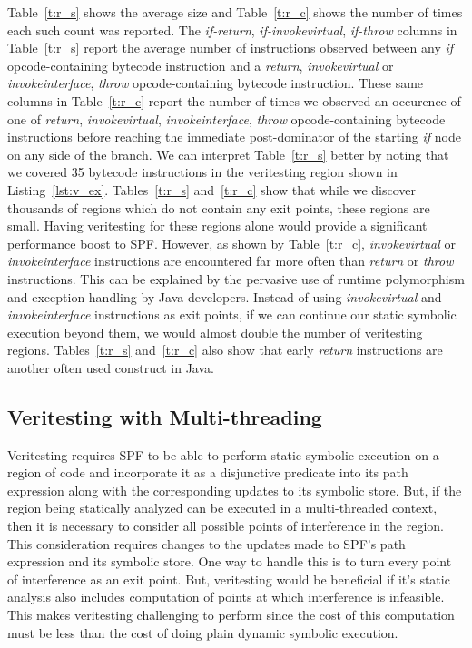 Table~\ref{t:r_s} shows the average size and Table~\ref{t:r_c} shows the number of times each such count was reported. 
%
The \textit{if-return}, \textit{if-invokevirtual}, \textit{if-throw} columns in Table~\ref{t:r_s} report the average number of instructions observed between any \textit{if} opcode-containing bytecode instruction and a \textit{return}, \textit{invokevirtual} or \textit{invokeinterface}, \textit{throw} opcode-containing bytecode instruction.
%
These same columns in Table~\ref{t:r_c} report the number of times we observed an occurence of one of \textit{return}, \textit{invokevirtual}, \textit{invokeinterface}, \textit{throw} opcode-containing bytecode instructions before reaching the immediate post-dominator of the starting \textit{if} node on any side of the branch.
%
We can interpret Table~\ref{t:r_s} better by noting that we covered 35 bytecode instructions in the veritesting region shown in Listing~\ref{lst:v_ex}.
%
Tables~\ref{t:r_s} and~\ref{t:r_c} show that while we discover thousands of regions which do not contain any exit points, these regions are small.
%
Having veritesting for these regions alone would provide a significant performance boost to SPF.
%
However, as shown by Table~\ref{t:r_c}, \textit{invokevirtual} or \textit{invokeinterface} instructions are encountered far more often than \textit{return} or \textit{throw} instructions.
%
This can be explained by the pervasive use of runtime polymorphism and exception handling by Java developers.
%
Instead of using \textit{invokevirtual} and \textit{invokeinterface} instructions as exit points, if we can continue our static symbolic execution beyond them, we would almost double the number of veritesting regions.
%
Tables~\ref{t:r_s} and~\ref{t:r_c} also show that early \textit{return} instructions are another often used construct in Java.
%
\subsection{Veritesting with Multi-threading}
Veritesting requires SPF to be able to perform static symbolic execution on a region of code and incorporate it as a disjunctive predicate into its path expression along with the corresponding updates to its symbolic store.
%
But, if the region being statically analyzed can be executed in a multi-threaded context, then it is necessary to consider all possible points of interference in the region.
%
This consideration requires changes to the updates made to SPF\rq s path expression and its symbolic store.
%
One way to handle this is to turn every point of interference as an exit point.
%
But, veritesting would be beneficial if it\rq s static analysis also includes computation of points at which interference is infeasible.
%
This makes veritesting challenging to perform since the cost of this computation must be less than the cost of doing plain dynamic symbolic execution. 
















